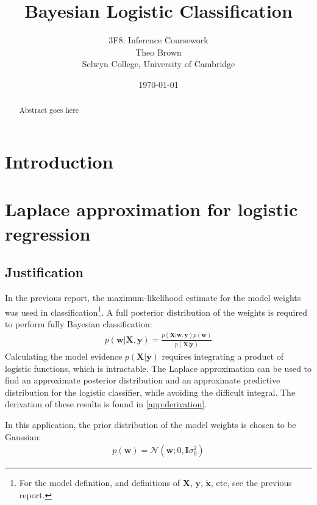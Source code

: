\documentclass[a4paper]{article}
\begin{document}
    \title{Bayesian Logistic Classification}
    \author{3F8: Inference Coursework \\ Theo Brown \\ Selwyn College, University of Cambridge}
    \date{\today}
    \maketitle

    \begin{abstract}
        Abstract goes here
    \end{abstract}
    
    \section{Introduction}\label{sec:introduction}

    \section{Laplace approximation for logistic regression}
    \subsection{Justification}
    In the previous report, the maximum-likelihood estimate for the model weights was used in classification\footnote{For the model definition, and definitions of $\bm{X}$, $\bm{y}$, $\tilde{\bm{x}}$, etc, see the previous report.}.
    A full posterior distribution of the weights is required to perform fully Bayesian classification:
    \begin{align}
        p(\bm{w} | \bm{X}, \bm{y}) = \frac{p(\bm{X} | \bm{w}, \bm{y}) p(\bm w)}{p(\bm{X} | \bm{y})}
        \label{eq:posterior}
    \end{align}
    Calculating the model evidence $p(\bm{X} | \bm{y})$ requires integrating a product of logistic functions, which is intractable.
    The Laplace approximation can be used to find an approximate posterior distribution and an approximate predictive distribution for the logistic classifier, while avoiding the difficult integral.
    The derivation of these results is found in \autoref{app:derivation}.

    In this application, the prior distribution of the model weights is chosen to be Gaussian:
    \begin{align}
        p(\bm{w}) = \mathcal{N}(\bm{w}; 0, \bm{I}\sigma_0^2)
    \end{align}
    
\end{document}
